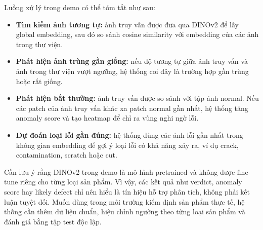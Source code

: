 Luồng xử lý trong demo có thể tóm tắt như sau:

\begin{itemize}
    \item \textbf{Tìm kiếm ảnh tương tự:} ảnh truy vấn được đưa qua DINOv2 để lấy global embedding, sau đó so sánh cosine similarity với embedding của các ảnh trong thư viện.
    \item \textbf{Phát hiện ảnh trùng gần giống:} nếu độ tương tự giữa ảnh truy vấn và ảnh trong thư viện vượt ngưỡng, hệ thống coi đây là trường hợp gần trùng hoặc rất giống.
    \item \textbf{Phát hiện bất thường:} ảnh truy vấn được so sánh với tập ảnh normal. Nếu các patch của ảnh truy vấn khác xa patch normal gần nhất, hệ thống tăng anomaly score và tạo heatmap để chỉ ra vùng nghi ngờ lỗi.
    \item \textbf{Dự đoán loại lỗi gần đúng:} hệ thống dùng các ảnh lỗi gần nhất trong không gian embedding để gợi ý loại lỗi có khả năng xảy ra, ví dụ crack, contamination, scratch hoặc cut.
\end{itemize}

Cần lưu ý rằng DINOv2 trong demo là mô hình pretrained và không được fine-tune riêng cho từng loại sản phẩm. Vì vậy, các kết quả như verdict, anomaly score hay likely defect chỉ nên hiểu là tín hiệu hỗ trợ phân tích, không phải kết luận tuyệt đối. Muốn dùng trong môi trường kiểm định sản phẩm thực tế, hệ thống cần thêm dữ liệu chuẩn, hiệu chỉnh ngưỡng theo từng loại sản phẩm và đánh giá bằng tập test độc lập.
